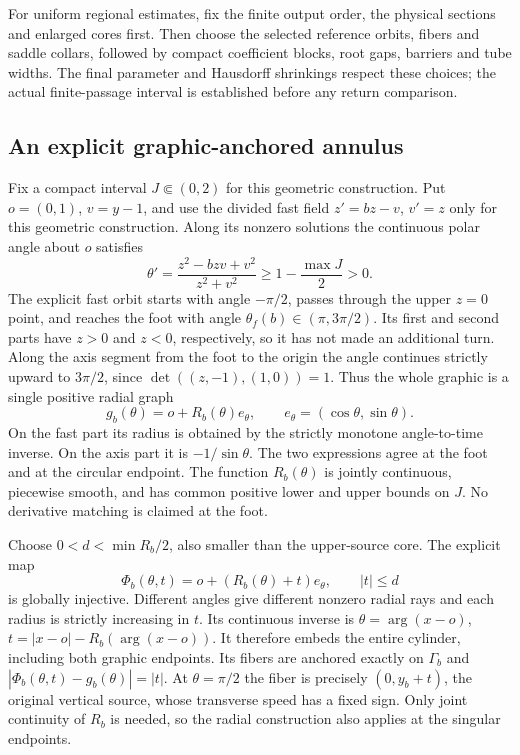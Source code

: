 For uniform regional estimates, fix the finite output order, the
physical sections and enlarged cores first. Then choose the selected
reference orbits, fibers and saddle collars, followed by compact
coefficient blocks, root gaps, barriers and tube widths. The final
parameter and Hausdorff shrinkings respect these choices; the actual
finite-passage interval is established before any return comparison.

\subsection{An explicit graphic-anchored annulus}
\label{sec:graphic-anchored-annulus}
Fix a compact interval $J\Subset(0,2)$ for this geometric construction.
Put $o=(0,1)$, $v=y-1$, and use the divided fast field
$z'=bz-v$, $v'=z$ only for this geometric construction.
Along its nonzero solutions the continuous polar angle about $o$
satisfies
\[
 \theta'=\frac{z^2-bzv+v^2}{z^2+v^2}
                         \ge1-\frac{\max J}{2}>0 .
\]
The explicit fast orbit starts with angle $-\pi/2$, passes
through the upper $z=0$ point, and reaches the foot with angle
$\theta_f(b)\in(\pi,3\pi/2)$. Its first and second parts have
$z>0$ and $z<0$, respectively, so it has not made an additional
turn. Along the axis segment from the foot to the origin the
angle continues strictly upward to $3\pi/2$, since
$\det((z,-1),(1,0))=1$.
Thus the whole graphic is a single positive radial graph
\[
 g_b(\theta)=o+R_b(\theta)e_\theta,\qquad
 e_\theta=(\cos\theta,\sin\theta).
\]
On the fast part its radius is obtained by the strictly monotone
angle-to-time inverse. On the axis part it is $-1/\sin\theta$.
The two expressions agree at the foot and at the circular
endpoint. The function $R_b(\theta)$ is jointly continuous,
piecewise smooth, and has common positive lower and upper
bounds on $J$. No derivative matching is claimed at the foot.

Choose $0<d<\min R_b/2$, also smaller than the upper-source core.
The explicit map
\[
 \Phi_b(\theta,t)=o+(R_b(\theta)+t)e_\theta,\qquad |t|\le d
\]
is globally injective. Different angles give different nonzero
radial rays and each radius is strictly increasing in $t$.
Its continuous inverse is
$\theta=\arg(x-o)$, $t=|x-o|-R_b(\arg(x-o))$.
It therefore embeds the entire cylinder, including both graphic
endpoints. Its fibers are anchored exactly on $\Gamma_b$ and
$|\Phi_b(\theta,t)-g_b(\theta)|=|t|$.
At $\theta=\pi/2$ the fiber is precisely $(0,y_b+t)$,
the original vertical source, whose transverse speed has a
fixed sign. Only joint continuity of $R_b$ is needed, so the radial
construction also applies at the singular endpoints.


